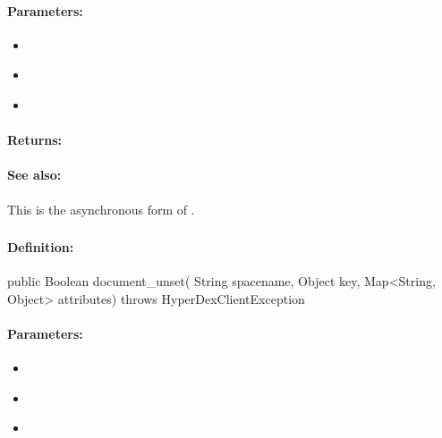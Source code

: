 \paragraph{Parameters:}
\begin{itemize}[noitemsep]
\item {}\\

\item {}\\

\item {}\\

\end{itemize}

\paragraph{Returns:}


\paragraph{See also:}  This is the asynchronous form of .

\pagebreak
\subsubsection{}
\label{api:java:document_unset}


\paragraph{Definition:}
\begin{javacode}
public Boolean document_unset(
        String spacename,
        Object key,
        Map<String, Object> attributes) throws HyperDexClientException
\end{javacode}

\paragraph{Parameters:}
\begin{itemize}[noitemsep]
\item {}\\

\item {}\\

\item {}\\

\end{itemize}

